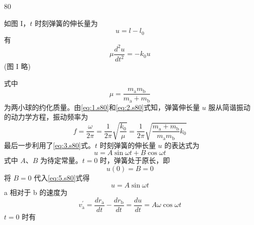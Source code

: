 \begin{solution}{80}
    \begin{subsolution}
        \begin{subsubsolution}
            如图 I，$t$ 时刻弹簧的伸长量为
            \begin{equation}
                u = l - l_{0}
                \label{eq:1.s80}
            \end{equation}
            有
            \begin{equation}
                \mu \frac{d^{2} u}{d t^{2}} = - k_{0} u
                \label{eq:2.s80}
            \end{equation}
            (图 I 略)

            式中
            \begin{equation}
                \mu = \frac{m_{\mathrm{a}} m_{\mathrm{b}}}{m_{\mathrm{a}} + m_{\mathrm{b}}}
                \label{eq:3.s80}
            \end{equation}
            为两小球的约化质量。由\eqref{eq:1.s80}和\eqref{eq:2.s80}式知，弹簧伸长量 $u$ 服从简谐振动的动力学方程，振动频率为
            \begin{equation}
                f = \frac{\omega}{2\pi} = \frac{1}{2\pi} \sqrt{\frac{k_{0}}{\mu}} = \frac{1}{2\pi} \sqrt{\frac{m_{\mathrm{a}} + m_{\mathrm{b}}}{m_{\mathrm{a}} m_{\mathrm{b}}} k_{0}}
                \label{eq:4.s80}
            \end{equation}
            最后一步利用了\eqref{eq:3.s80}式。$t$ 时刻弹簧的伸长量 $u$ 的表达式为
            \begin{equation}
                u = A \sin \omega t + B \cos \omega t
                \label{eq:5.s80}
            \end{equation}
            式中 $A$、$B$ 为待定常量。$t=0$ 时，弹簧处于原长，即
            \[
                u(0) = B = 0
            \]
            将 $B=0$ 代入\eqref{eq:5.s80}式得
            \begin{equation}
                u = A \sin \omega t
                \label{eq:6.s80}
            \end{equation}
            a 相对于 b 的速度为
            \begin{equation}
                v_{\mathrm{a}}^{\prime} = \frac{d r_{\mathrm{a}}}{d t} - \frac{d r_{\mathrm{b}}}{d t} = \frac{d u}{d t} = A \omega \cos \omega t
                \label{eq:7.s80}
            \end{equation}
            $t=0$ 时有
            \begin{equation}

\end{equation}
\end{subsubsolution}
\end{subsolution}
\end{solution}
